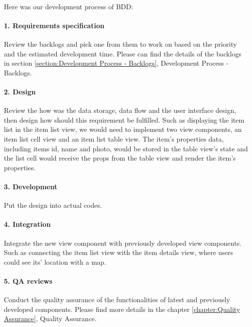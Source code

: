 \documentclass[12pt,a4paper]{article}
\begin{document}
          \paragraph{}Here was our development process of BDD:
          
          \paragraph{1. Requirements specification}Review the backlogs and pick one from them to work on based on the priority and the estimated development time. Please can find the details of the backlogs in section \ref{section:Development Process - Backlogs}, Development Process - Backlogs.
          
          \paragraph{2. Design}Review the how was the data storage, data flow and the user interface design, then design how should this requirement be fulfilled. Such as displaying the item list in the item list view, we would need to implement two view components, an item list cell view and an item list table view. The item's properties data, including items id, name and photo, would be stored in the table view's state and the list cell would receive the props from the table view and render the item's properties.
          
          \paragraph{3. Development}Put the design into actual codes.
          
          \paragraph{4. Integration}Integrate the new view component with previously developed view components. Such as connecting the item list view with the item details view, where users could see its' location with a map.
          
          \paragraph{5. QA reviews}Conduct the quality assurance of the functionalities of latest and previously developed components. Please find more details in the chapter \ref{chapter:Quality Assurance}, Quality Assurance.
          
\end{document}
